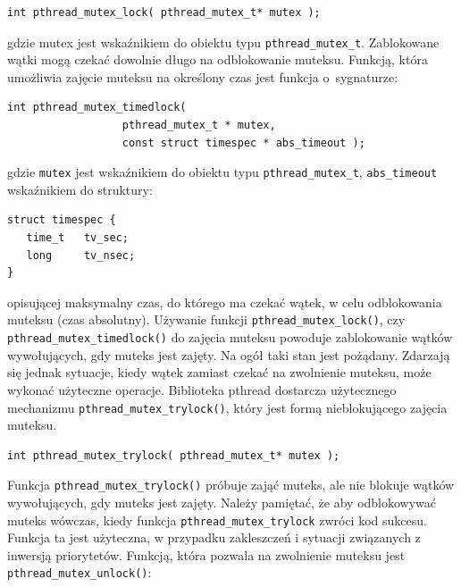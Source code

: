 \begin{lstlisting}[style=MyCStyle]
int pthread_mutex_lock( pthread_mutex_t* mutex );
\end{lstlisting}

gdzie mutex jest wskaźnikiem do obiektu typu \lstinline[style=MyCStyle]{pthread_mutex_t}. Zablokowane wątki mogą czekać dowolnie długo na odblokowanie muteksu. Funkcją, która umożliwia zajęcie muteksu na określony czas jest funkcja o~sygnaturze:

\begin{lstlisting}[style=MyCStyle]
int pthread_mutex_timedlock(
                  pthread_mutex_t * mutex,
                  const struct timespec * abs_timeout );
\end{lstlisting}

gdzie \lstinline[style=MyCStyle]{mutex} jest wskaźnikiem do obiektu typu \lstinline[style=MyCStyle]{pthread_mutex_t}, \lstinline[style=MyCStyle]{abs_timeout} wskaźnikiem do struktury:

\begin{lstlisting}[style=MyCStyle]
struct timespec {
   time_t   tv_sec;
   long     tv_nsec;
}
\end{lstlisting}

opisującej maksymalny czas, do którego ma czekać wątek, w celu odblokowania muteksu (czas absolutny).
Używanie funkcji \lstinline[style=MyCStyle]{pthread_mutex_lock()}, czy \lstinline[style=MyCStyle]{pthread_mutex_timedlock()} do zajęcia muteksu powoduje zablokowanie wątków wywołujących, gdy muteks jest zajęty. Na ogół taki stan jest pożądany. Zdarzają się jednak sytuacje, kiedy wątek zamiast czekać na zwolnienie muteksu, może wykonać użyteczne operacje. Biblioteka pthread dostarcza użytecznego mechanizmu \lstinline[style=MyCStyle]{pthread_mutex_trylock()}, który jest formą nieblokującego zajęcia muteksu.

\begin{lstlisting}[style=MyCStyle]
int pthread_mutex_trylock( pthread_mutex_t* mutex );
\end{lstlisting}

Funkcja \lstinline[style=MyCStyle]{pthread_mutex_trylock()} próbuje zająć muteks, ale nie blokuje wątków wywołujących, gdy muteks jest zajęty. Należy pamiętać, że aby odblokowywać muteks wówczas, kiedy funkcja \lstinline[style=MyCStyle]{pthread_mutex_trylock} zwróci kod sukcesu. Funkcja ta jest użyteczna, w przypadku zakleszczeń i sytuacji związanych z inwersją priorytetów. Funkcją, która pozwala na zwolnienie muteksu jest \lstinline[style=MyCStyle]{pthread_mutex_unlock()}:


